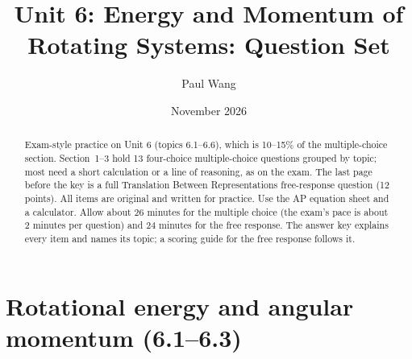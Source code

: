 \documentclass[11pt]{article}
\title{Unit 6: Energy and Momentum of Rotating Systems: Question Set}
\author{Paul Wang}
\date{November 2026}
\begin{document}
\maketitle

\begin{abstract}
Exam-style practice on Unit 6 (topics 6.1--6.6), which is 10--15\% of the multiple-choice section. Section~1--3 hold 13 four-choice multiple-choice questions grouped by topic; most need a short calculation or a line of reasoning, as on the exam. The last page before the key is a full Translation Between Representations free-response question (12 points). All items are original and written for practice. Use the AP equation sheet and a calculator. Allow about 26 minutes for the multiple choice (the exam's pace is about 2 minutes per question) and 24 minutes for the free response. The answer key explains every item and names its topic; a scoring guide for the free response follows it.
\end{abstract}


\section{Rotational energy and angular momentum (6.1--6.3)}
\end{document}
